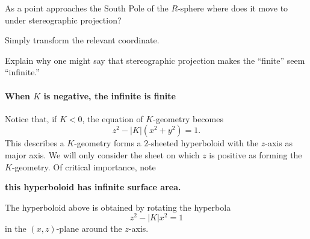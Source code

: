 \documentclass{ximera}
\begin{document}
\begin{problem}
  As a point approaches the South Pole of the $R$-sphere where does it
  move to under stereographic projection?
  \begin{hint}
    Simply transform the relevant coordinate.
  \end{hint}
  \begin{freeResponse}
  \end{freeResponse}
\end{problem}



\begin{problem}
  Explain why one might say that stereographic projection makes the
  ``finite'' seem ``infinite.''
    \begin{freeResponse}
    \end{freeResponse}
\end{problem}




\paragraph{When $K$ is negative, the infinite is finite}


Notice that, if $K<0$, the equation of $K$-geometry becomes
\[
z^{2}-|K|\left(x^{2}+y^{2}\right)  =1.
\]
This describes a $K$-geometry forms a $2$-sheeted hyperboloid with the
$z$-axis as major axis. We will only consider the sheet on which $z$
is positive as forming the $K$-geometry.  Of critical importance, note

\begin{center}
  \textbf{this hyperboloid has infinite surface area.}
\end{center}

The hyperboloid above is obtained by rotating the hyperbola
\[
z^{2}-\left\vert K\right\vert x^{2}= 1
\]
in the $(x,z)$-plane around the $z$-axis.
\end{document}
